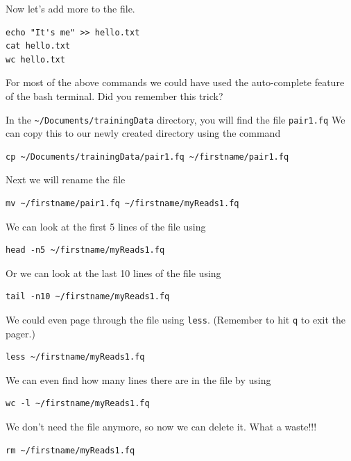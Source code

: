 \begin{steps}
Now let's add more to the file.
\begin{lstlisting}
echo "It's me" >> hello.txt
cat hello.txt
wc hello.txt
\end{lstlisting}
\end{steps}

\begin{note}
For most of the above commands we could have used the auto-complete feature of the bash terminal.
Did you remember this trick?
\end{note}

\begin{steps}
In the \texttt{\~{}/Documents/trainingData} directory, you will find the file \texttt{pair1.fq}
We can copy this to our newly created directory using the command \\
\begin{lstlisting}
cp ~/Documents/trainingData/pair1.fq ~/firstname/pair1.fq
\end{lstlisting}

Next we will rename the file \\
\begin{lstlisting}
mv ~/firstname/pair1.fq ~/firstname/myReads1.fq
\end{lstlisting}

We can look at the first 5 lines of the file using \\
\begin{lstlisting}
head -n5 ~/firstname/myReads1.fq
\end{lstlisting}

Or we can look at the last 10 lines of the file using \\
\begin{lstlisting}
tail -n10 ~/firstname/myReads1.fq
\end{lstlisting}

We could even page through the file using \texttt{less}.
(Remember to hit \texttt{q} to exit the pager.)\\
\begin{lstlisting}
less ~/firstname/myReads1.fq
\end{lstlisting}

We can even find how many lines there are in the file by using \\
\begin{lstlisting}
wc -l ~/firstname/myReads1.fq
\end{lstlisting}

We don't need the file anymore, so now we can delete it.
What a waste!!!
\begin{lstlisting}
rm ~/firstname/myReads1.fq
\end{lstlisting}

\end{steps}

